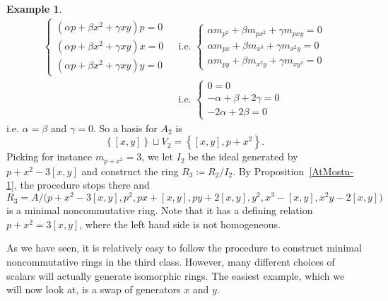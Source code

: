 \documentclass[11pt]{article}
\theoremstyle{definition}
\newtheorem{numberedexample}[corollary]{Example}
\begin{document}
\begin{numberedexample}
\begin{align*}
\begin{cases}
(\alpha p+ \beta x^2+\gamma xy)p=0\\
(\alpha p +\beta x^2+\gamma xy)x=0\\
(\alpha p+\beta x^2+\gamma xy)y=0
\end{cases}&\text{ i.e. }\begin{cases}
\alpha m_{p^2}+\beta m_{px^2}+\gamma m_{pxy}=0\\
\alpha m_{px}+\beta m_{x^3}+\gamma m_{x^2y}=0\\
\alpha m_{py}+\beta m_{x^2y}+\gamma m_{xy^2}=0
\end{cases}\\
&\text{ i.e. }\begin{cases}
0=0\\
-\alpha+\beta+2\gamma=0\\
-2\alpha+2\beta=0
\end{cases}
\end{align*}
i.e. $\alpha=\beta$ and $\gamma=0$. So a basis for $A_2$ is
\[\left\lbrace [x,y]\right\rbrace\sqcup V_2=\left\lbrace [x,y],p+x^2\right\rbrace.\]
Picking for instance $m_{p+x^2}=3$, we let $I_2$ be the ideal generated by $p+x^2-3[x,y]$ and construct the ring $R_3\coloneqq R_2/I_2$. By Proposition~\ref{AtMostn-1}, the procedure stops there and
\[R_3=A/\big(p+x^2-3[x,y],p^2,px+[x,y],py+2[x,y],y^2,x^3-[x,y],x^2y-2[x,y]\big)\]
is a minimal noncommutative ring. Note that it has a defining relation $p+x^2=3[x,y]$, where the left hand side is not homogeneous.
\end{numberedexample}

As we have seen, it is relatively easy to follow the procedure to construct minimal noncommutative rings in the third class. However, many different choices of scalars will actually generate isomorphic rings. The easiest example, which we will now look at, is a swap of generators $x$ and $y$.
\end{document}
